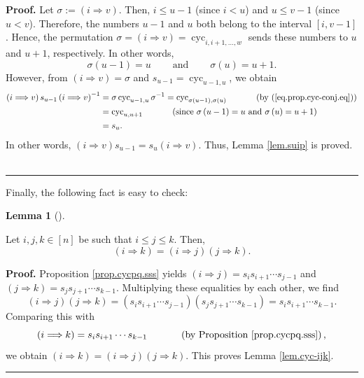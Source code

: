 \documentclass[numbers=enddot,12pt,final,onecolumn,notitlepage]{scrartcl}%
\theoremstyle{definition}
\newtheorem{lem}[theo]{Lemma}
\newenvironment{lemma}[1][]
{\begin{lem}[#1]\begin{leftbar}}
{\end{leftbar}\end{lem}}
\newenvironment{proof}[1][Proof]{\noindent\textbf{#1.} }{\ \rule{0.5em}{0.5em}}
\begin{document}
\begin{proof}
Let $\sigma:=\left(  i\Longrightarrow v\right)  $. Then, $i\leq u-1$ (since
$i<u$) and $u\leq v-1$ (since $u<v$). Therefore, the numbers $u-1$ and $u$
both belong to the interval $\left[  i,v-1\right]  $. Hence, the permutation
$\sigma=\left(  i\Longrightarrow v\right)  =\operatorname*{cyc}%
\nolimits_{i,i+1,\ldots,w}$ sends these numbers to $u$ and $u+1$,
respectively. In other words,%
\[
\sigma\left(  u-1\right)  =u\ \ \ \ \ \ \ \ \ \ \text{and}%
\ \ \ \ \ \ \ \ \ \ \sigma\left(  u\right)  =u+1.
\]
However, from $\left(  i\Longrightarrow v\right)  =\sigma$ and $s_{u-1}%
=\operatorname*{cyc}\nolimits_{u-1,u}$, we obtain%
\begin{align*}
\left(  i\Longrightarrow v\right)  s_{u-1}\left(  i\Longrightarrow v\right)
^{-1}  &  =\sigma\operatorname*{cyc}\nolimits_{u-1,u}\sigma^{-1}%
=\operatorname*{cyc}\nolimits_{\sigma\left(  u-1\right)  ,\sigma\left(
u\right)  }\ \ \ \ \ \ \ \ \ \ \left(  \text{by (\ref{eq.prop.cyc-conj.eq}%
)}\right) \\
&  =\operatorname*{cyc}\nolimits_{u,u+1}\ \ \ \ \ \ \ \ \ \ \left(
\text{since }\sigma\left(  u-1\right)  =u\text{ and }\sigma\left(  u\right)
=u+1\right) \\
&  =s_{u}.
\end{align*}
In other words, $\left(  i\Longrightarrow v\right)  s_{u-1}=s_{u}\left(
i\Longrightarrow v\right)  $. Thus, Lemma \ref{lem.suip} is proved.
\end{proof}

Finally, the following fact is easy to check:

\begin{lemma}
\label{lem.cyc-ijk}Let $i,j,k\in\left[  n\right]  $ be such that $i\leq j\leq
k$. Then,%
\[
\left(  i\Longrightarrow k\right)  =\left(  i\Longrightarrow j\right)  \left(
j\Longrightarrow k\right)  .
\]

\end{lemma}

\begin{proof}
Proposition \ref{prop.cycpq.sss} yields $\left(  i\Longrightarrow j\right)
=s_{i}s_{i+1}\cdots s_{j-1}$ and $\left(  j\Longrightarrow k\right)
=s_{j}s_{j+1}\cdots s_{k-1}$. Multiplying these equalities by each other, we
find%
\[
\left(  i\Longrightarrow j\right)  \left(  j\Longrightarrow k\right)  =\left(
s_{i}s_{i+1}\cdots s_{j-1}\right)  \left(  s_{j}s_{j+1}\cdots s_{k-1}\right)
=s_{i}s_{i+1}\cdots s_{k-1}.
\]
Comparing this with%
\[
\left(  i\Longrightarrow k\right)  =s_{i}s_{i+1}\cdots s_{k-1}%
\ \ \ \ \ \ \ \ \ \ \left(  \text{by Proposition \ref{prop.cycpq.sss}}\right)
,
\]
we obtain $\left(  i\Longrightarrow k\right)  =\left(  i\Longrightarrow
j\right)  \left(  j\Longrightarrow k\right)  $. This proves Lemma
\ref{lem.cyc-ijk}.
\end{proof}
\end{document}
